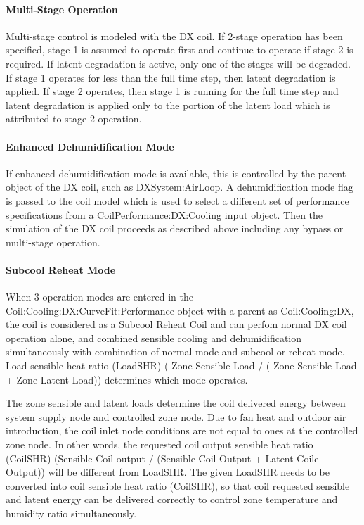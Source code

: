 \paragraph{Multi-Stage Operation}\label{multi-stage-operation}

Multi-stage control is modeled with the DX coil. If 2-stage operation has been specified, stage 1 is assumed to operate first and continue to operate if stage 2 is required. If latent degradation is active, only one of the stages will be degraded. If stage 1 operates for less than the full time step, then latent degradation is applied. If stage 2 operates, then stage 1 is running for the full time step and latent degradation is applied only to the portion of the latent load which is attributed to stage 2 operation.

\paragraph{Enhanced Dehumidification Mode}\label{enhanced-dehumidification-mode}

If enhanced dehumidification mode is available, this is controlled by the parent object of the DX coil, such as DXSystem:AirLoop. A dehumidification mode flag is passed to the coil model which is used to select a different set of performance specifications from a CoilPerformance:DX:Cooling input object. Then the simulation of the DX coil proceeds as described above including any bypass or multi-stage operation.

\paragraph{Subcool Reheat Mode}\label{subcool-reheat-mode}

When 3 operation modes are entered in the Coil:Cooling:DX:CurveFit:Performance object with a parent as Coil:Cooling:DX, the coil is considered as a Subcool Reheat Coil and can perfom normal DX coil operation alone, and combined sensible cooling and dehumidification simultaneously with combination of normal mode and subcool or reheat mode. Load sensible heat ratio (LoadSHR) ( Zone Sensible Load / ( Zone Sensible Load + Zone Latent Load)) determines which mode operates.

The zone sensible and latent loads determine the coil delivered energy between system supply node and controlled zone node. Due to fan heat and outdoor air introduction, the coil inlet node conditions are not equal to ones at the controlled zone node. In other words, the requested coil output sensible heat ratio (CoilSHR) (Sensible Coil output / (Sensible Coil Output + Latent Coile Output)) will be different from LoadSHR. The given LoadSHR needs to be converted into coil sensible heat ratio (CoilSHR), so that coil requested sensible and latent energy can be delivered correctly to control zone temperature and humidity ratio simultaneously.

